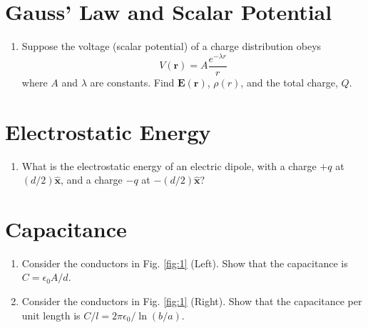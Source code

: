 \documentclass[10pt]{article}
\begin{document}
\section{Gauss' Law and Scalar Potential}

\begin{enumerate}
\item Suppose the voltage (scalar potential) of a charge distribution obeys
\begin{equation}
V(\mathbf{r}) = A \frac{e^{-\lambda r}}{r}
\end{equation}
\noindent where $A$ and $\lambda$ are constants.  Find $\mathbf{E}(\mathbf{r})$, $\rho(r)$, and the total charge, $Q$. \\ \vspace{3cm}
\end{enumerate}

\section{Electrostatic Energy}

\begin{enumerate}
\item What is the electrostatic energy of an electric dipole, with a charge $+q$ at $(d/2)\hat{\mathbf{x}}$, and a charge $-q$ at $-(d/2)\hat{\mathbf{x}}$? \\ \vspace{1.5cm}
\end{enumerate}

\section{Capacitance}

\begin{enumerate}
\item Consider the conductors in Fig. \ref{fig:1} (Left). Show that the capacitance is $C = \epsilon_0 A/d$. \\ \vspace{2cm}
\item Consider the conductors in Fig. \ref{fig:1} (Right).  Show that the capacitance per unit length is $C/l = 2\pi\epsilon_0/\ln(b/a)$.
\end{enumerate}
\end{document}
